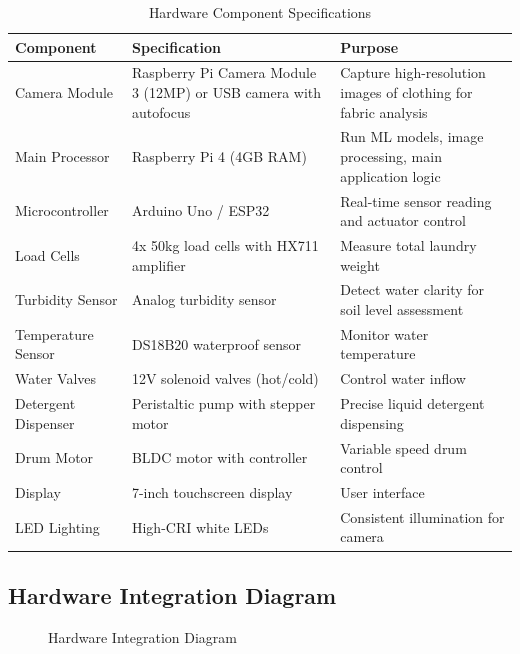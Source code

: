 \begin{table}[H]
\centering
\caption{Hardware Component Specifications}
\label{tab:hardware}
\begin{tabular}{|l|p{3.5cm}|p{6cm}|}
\hline
\textbf{Component} & \textbf{Specification} & \textbf{Purpose} \\
\hline
Camera Module & Raspberry Pi Camera Module 3 (12MP) or USB camera with autofocus & Capture high-resolution images of clothing for fabric analysis \\
\hline
Main Processor & Raspberry Pi 4 (4GB RAM) & Run ML models, image processing, main application logic \\
\hline
Microcontroller & Arduino Uno / ESP32 & Real-time sensor reading and actuator control \\
\hline
Load Cells & 4x 50kg load cells with HX711 amplifier & Measure total laundry weight \\
\hline
Turbidity Sensor & Analog turbidity sensor & Detect water clarity for soil level assessment \\
\hline
Temperature Sensor & DS18B20 waterproof sensor & Monitor water temperature \\
\hline
Water Valves & 12V solenoid valves (hot/cold) & Control water inflow \\
\hline
Detergent Dispenser & Peristaltic pump with stepper motor & Precise liquid detergent dispensing \\
\hline
Drum Motor & BLDC motor with controller & Variable speed drum control \\
\hline
Display & 7-inch touchscreen display & User interface \\
\hline
LED Lighting & High-CRI white LEDs & Consistent illumination for camera \\
\hline
\end{tabular}
\end{table}

\subsection{Hardware Integration Diagram}

\begin{figure}[H]
\centering
{}
\caption{Hardware Integration Diagram}
\label{fig:hw}
\end{figure}

